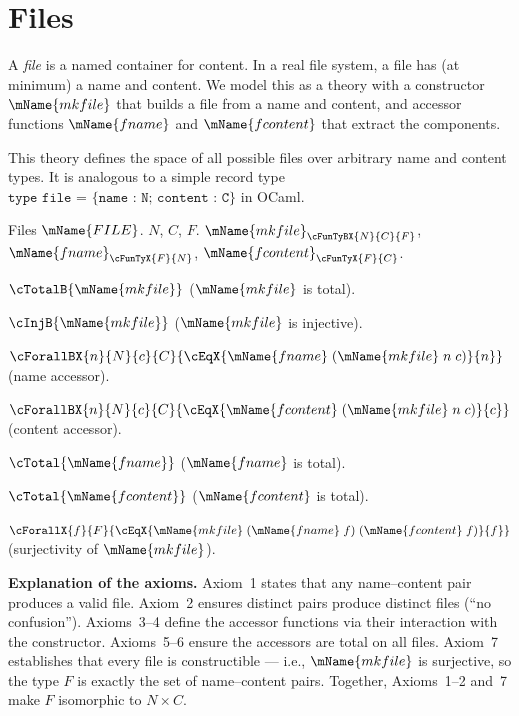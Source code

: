 \documentclass[11pt]{article}
\newcommand{\FILETYPE}{\mName{FILE}}
\newcommand{\mkfile}{\mName{mkfile}}
\newcommand{\fname}{\mName{fname}}
\newcommand{\fcontent}{\mName{fcontent}}
\begin{document}
\newpage
\section{Files}
\label{sec:files}

A \emph{file} is a named container for content.  In a real file
system, a file has (at minimum) a name and content.  We model
this as a theory with a constructor $\mkfile$ that builds a file
from a name and content, and accessor functions $\fname$ and
$\fcontent$ that extract the components.

This theory defines the space of all possible files over arbitrary
name and content types.  It is analogous to a simple record type
$\texttt{type file = \{name : N; content : C\}}$ in OCaml.

\begin{theory-def}
{Files}
{$\FILETYPE$.}
{$N$, $C$, $F$.}
{$\mkfile_{\cFunTyBX{N}{C}{F}}$,\;
 $\fname_{\cFunTyX{F}{N}}$,\;
 $\fcontent_{\cFunTyX{F}{C}}$.}
{
\be
\item $\cTotalB{\mkfile}$
      \hfill ($\mkfile$ is total).

\item $\cInjB{\mkfile}$
      \hfill ($\mkfile$ is injective).

\item $\cForallBX{n}{N}{c}{C}{
      \cEqX{\fname\;(\mkfile\;n\;c)}{n}}$
      \hfill (name accessor).

\item $\cForallBX{n}{N}{c}{C}{
      \cEqX{\fcontent\;(\mkfile\;n\;c)}{c}}$
      \hfill (content accessor).

\item $\cTotal{\fname}$
      \hfill ($\fname$ is total).

\item $\cTotal{\fcontent}$
      \hfill ($\fcontent$ is total).

\item $\cForallX{f}{F}{\cEqX{\mkfile\;(\fname\;f)\;(\fcontent\;f)}{f}}$
      \hfill (surjectivity of $\mkfile$).
\ee
}
\end{theory-def}

\medskip
\noindent\textbf{Explanation of the axioms.}
Axiom~1 states that any name--content pair produces a valid file.
Axiom~2 ensures distinct pairs produce distinct files (``no
confusion'').  Axioms~3--4 define the accessor functions via their
interaction with the constructor.  Axioms~5--6 ensure the accessors
are total on all files.  Axiom~7 establishes that every file is
constructible --- i.e., $\mkfile$ is surjective, so the type $F$ is
exactly the set of name--content pairs.  Together, Axioms~1--2 and~7
make $F$ isomorphic to $N \times C$.
\end{document}
